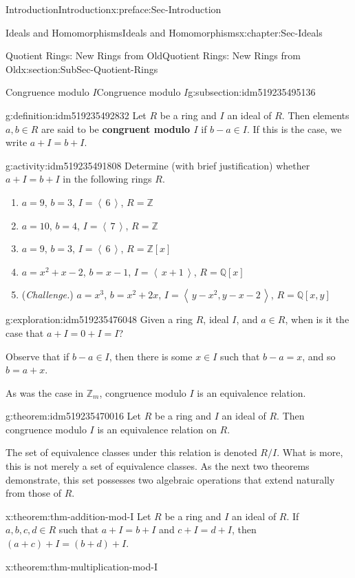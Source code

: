 \documentclass[oneside,10pt,]{book}
\newcommand{\terminology}[1]{\textbf{#1}}
\numberwithin{equation}{section}
\newcommand{\ideal}[1]{\left\langle\, #1 \,\right\rangle}
\def\Z{{\mathbb Z}}
\def\Q{{\mathbb Q}}
\begin{document}
\begin{preface}{Introduction}{}{Introduction}{}{}{x:preface:Sec-Introduction}
\begin{chapterptx}{Ideals and Homomorphisms}{}{Ideals and Homomorphisms}{}{}{x:chapter:Sec-Ideals}
\begin{sectionptx}{Quotient Rings: New Rings from Old}{}{Quotient Rings: New Rings from Old}{}{}{x:section:SubSec-Quotient-Rings}
\begin{subsectionptx}{Congruence modulo \(I\)}{}{Congruence modulo \(I\)}{}{}{g:subsection:idm519235495136}
\begin{definition}{}{g:definition:idm519235492832}%
%
Let \(R\) be a ring and \(I\) an ideal of \(R\). Then elements \(a,b\in R\) are said to be \terminology{congruent modulo \(I\)} if \(b-a\in I\). If this is the case, we write \(a + I = b + I\).%
\end{definition}
\begin{activity}{}{g:activity:idm519235491808}%
Determine (with brief justification) whether \(a + I = b + I\) in the following rings \(R\).%
%
\begin{enumerate}
\item{}\(a = 9\), \(b = 3\), \(I = \ideal{6}\), \(R = \Z\)%
\item{}\(a = 10\), \(b = 4\), \(I = \ideal{7}\), \(R = \Z\)%
\item{}\(a = 9\), \(b = 3\), \(I = \ideal{6}\), \(R = \Z[x]\)%
\item{}\(a = x^2+x-2\), \(b = x-1\), \(I = \ideal{x+1}\), \(R = \Q[x]\)%
\item{}(\emph{Challenge.}) \(a = x^3\), \(b = x^2+2x\), \(I = \ideal{y-x^2, y-x-2}\), \(R = \Q[x,y]\)%
\end{enumerate}
\end{activity}
\begin{exploration}{}{g:exploration:idm519235476048}%
Given a ring \(R\), ideal \(I\), and \(a\in R\), when is it the case that \(a + I = 0 + I = I\)?%
\end{exploration}
Observe that if \(b-a \in I\), then there is some \(x\in I\) such that \(b-a = x\), and so \(b = a+x\).%
\par
As was the case in \(\Z_m\), congruence modulo \(I\) is an equivalence relation.%
\begin{theorem}{}{}{g:theorem:idm519235470016}%
Let \(R\) be a ring and \(I\) an ideal of \(R\). Then congruence modulo \(I\) is an equivalence relation on \(R\).%
\end{theorem}
The set of equivalence classes under this relation is denoted \(R/I\). What is more, this is not merely a set of equivalence classes. As the next two theorems demonstrate, this set possesses two algebraic operations that extend naturally from those of \(R\).%
\begin{theorem}{}{}{x:theorem:thm-addition-mod-I}%
Let \(R\) be a ring and \(I\) an ideal of \(R\). If \(a,b,c,d\in R\) such that \(a+I = b+I\) and \(c+I = d+I\), then \((a+c) + I = (b+d) + I\).%
\end{theorem}
\begin{theorem}{}{}{x:theorem:thm-multiplication-mod-I}%

\end{theorem}
\end{subsectionptx}
\end{sectionptx}
\end{chapterptx}
\end{preface}
\end{document}
